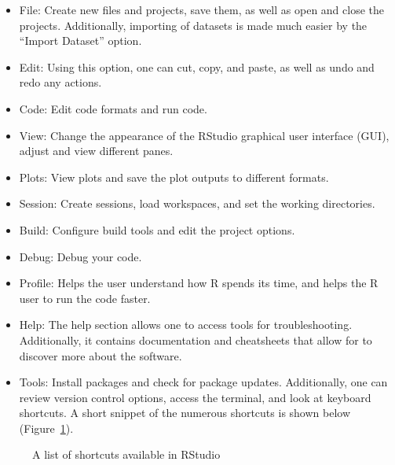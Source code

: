 \documentclass[
  letterpaper,
  DIV=11,
  numbers=noendperiod]{scrreprt}
\begin{document}
\begin{itemize}
\item
  File: Create new files and projects, save them, as well as open and
  close the projects. Additionally, importing of datasets is made much
  easier by the ``Import Dataset'' option.
\item
  Edit: Using this option, one can cut, copy, and paste, as well as undo
  and redo any actions.
\item
  Code: Edit code formats and run code.
\item
  View: Change the appearance of the RStudio graphical user interface
  (GUI), adjust and view different panes.
\item
  Plots: View plots and save the plot outputs to different formats.
\item
  Session: Create sessions, load workspaces, and set the working
  directories.
\item
  Build: Configure build tools and edit the project options.
\item
  Debug: Debug your code.
\item
  Profile: Helps the user understand how R spends its time, and helps
  the R user to run the code faster.
\item
  Help: The help section allows one to access tools for troubleshooting.
  Additionally, it contains documentation and cheatsheets that allow for
  to discover more about the software.
\item
  Tools: Install packages and check for package updates. Additionally,
  one can review version control options, access the terminal, and look
  at keyboard shortcuts. A short snippet of the numerous shortcuts is
  shown below (Figure~\ref{fig-rstudio-ks-1}).
\end{itemize}

\begin{figure}


\caption{\label{fig-rstudio-ks-1}A list of shortcuts available in
RStudio}

\end{figure}%
\end{document}
